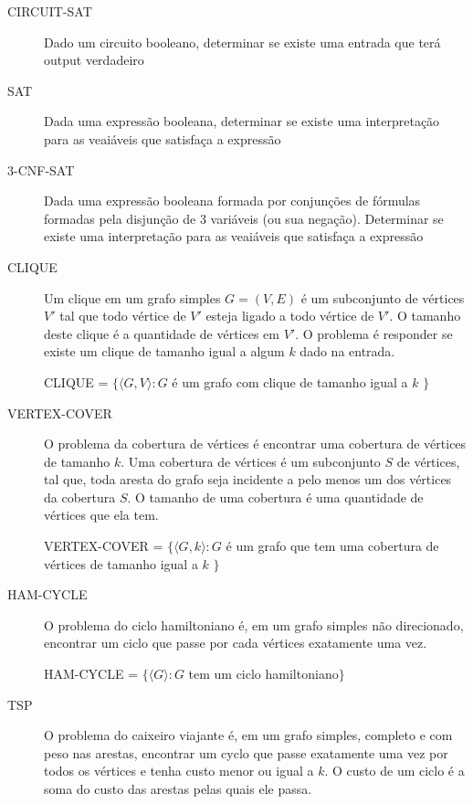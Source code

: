 \documentclass[12pt]{article}
\begin{document}
\begin{description}

\item[CIRCUIT-SAT]
Dado um circuito booleano, determinar se existe uma entrada que terá output verdadeiro

\item[SAT]
Dada uma expressão booleana, determinar se existe uma interpretação para as veaiáveis que satisfaça a expressão

\item[3-CNF-SAT]
Dada uma expressão booleana formada por conjunções de fórmulas formadas pela disjunção de 3 variáveis (ou sua negação). Determinar se existe uma interpretação para as veaiáveis que satisfaça a expressão


\item[CLIQUE]

Um clique em um grafo simples $G=(V,E)$ é um subconjunto de vértices $V'$ tal que todo vértice de $V'$ esteja ligado a todo vértice de $V'$. O tamanho deste clique é a quantidade de vértices em $V'$.
O problema é responder se existe um clique de tamanho igual a algum $k$ dado na entrada.

CLIQUE = $\{\langle G,V\rangle : G$ é um grafo com clique de tamanho igual a $k$ $\}$

\item[VERTEX-COVER]

O problema da cobertura de vértices é encontrar uma cobertura de vértices de tamanho $k$. 
Uma cobertura de vértices é um subconjunto $S$ de vértices, tal que, toda aresta do grafo seja incidente a pelo menos um dos vértices da cobertura $S$.
O tamanho de uma cobertura é uma quantidade de vértices que ela tem.

VERTEX-COVER = $\{\langle G,k\rangle : G$ é um grafo que tem uma cobertura de vértices de tamanho igual a $k$ $\}$

\item[HAM-CYCLE]

O problema do ciclo hamiltoniano é, em um grafo simples não direcionado, encontrar um ciclo que passe por cada vértices exatamente uma vez.

HAM-CYCLE = $\{\langle G\rangle : G$ tem um ciclo hamiltoniano$\}$


\item[TSP]

O problema do caixeiro viajante é, em um grafo simples, completo e com peso nas arestas, encontrar um cyclo que passe exatamente uma vez por todos os vértices e tenha custo menor ou igual a $k$.
O custo de um ciclo é a soma do custo das arestas pelas quais ele passa.


\end{description}
\end{document}
